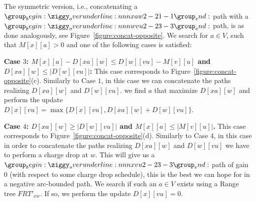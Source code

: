 \documentclass[11pt]{article}
\begin{document}
The symmetric version, i.e., concatenating a $\overunderline{xaw}{2-2}{1-1}$ path with a $\overunderline{wvu}{2-2}{3-3}$ path, is as done analogously, see Figure~\ref{figure:concat-opposite}. We search for $a\in V$, such that $M[x][a]>0$ and one of the following cases is satisfied:


\textbf{Case $3$: 
$M[x][a]-D[xa][w] \le D[w][vu]-M[v][u]$ and $D[xa][w] \le |D[w][vu]|$:} 
This case corresponds to Figure~\ref{figure:concat-opposite}(c).
Similarly to Case $1$, in this case we can concatenate the paths realizing $D[xa][w]$ and $D[w][vu]$. we find $a$ that maximize $D[xa][w]$ and perform the update $D[x][vu] = \max \{D[x][vu], D[xa][w] + D[w][vu] \}$.



\textbf{Case $4$:
 $ D[xa][w] \ge |D[w][vu]|$ and $M[x][a] \le |M[v][u]|$.}
 This case corresponds to Figure~\ref{figure:concat-opposite}(d).
 Similarly to Case $4$, in this case in order to concatenate the paths realizing $D[xa][w]$ and $D[w][vu]$ we have to perform a charge drop at $w$. This will give us a $\overunderline{xvu}{2-2}{3-3}$ path of gain $0$ (with respect to some charge drop schedule), this is the best we can hope for in a negative arc-bounded path. We search if such an $a\in V$ exists using a Range tree $FRT'_{xw}$. If so, we perform the update $D[x][vu] = 0$.
\end{document}
